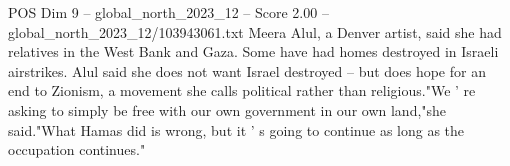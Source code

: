 \begin{textsample}{POS Dim 9 – global\_north\_2023\_12 – Score 2.00 – global\_north\_2023\_12/103943061.txt}
Meera Alul, a Denver artist, said she had relatives in the West Bank and Gaza.
Some have had homes destroyed in Israeli airstrikes.
Alul said she does not want Israel destroyed -- but does hope for an end to Zionism, a movement she calls political rather than religious."We ' re asking to simply be free with our own government in our own land,"she said."What Hamas did is wrong, but it ' s going to continue as long as the occupation continues."

\end{textsample}
